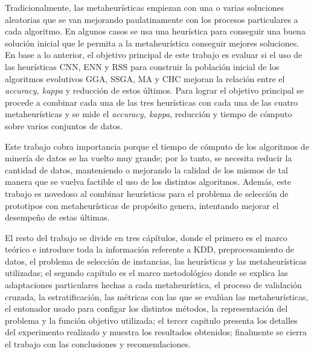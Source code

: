 Tradicionalmente, las metaheurísticas empiezan con una o varias soluciones aleatorias que se van mejorando paulatinamente con los procesos particulares a cada algoritmo. En algunos casos se usa una heurística para conseguir una buena solución inicial que le permita a la metaheurística conseguir mejores soluciones. En base a lo anterior, el objetivo principal de este trabajo es evaluar si el uso de las heurísticas CNN, ENN y RSS para construir la población inicial de los algoritmos evolutivos GGA, SSGA, MA y CHC  mejoran la relación entre el \emph{accuracy, kappa} y reducción de estos últimos. Para lograr el objetivo principal se procede a combinar cada una de las tres heurísticas con cada una de las cuatro metaheurísticas y se mide el \emph{accuracy, kappa}, reducción y tiempo de cómputo sobre varios conjuntos de datos. 

Este trabajo cobra importancia porque el tiempo de cómputo de los algoritmos de minería de datos se ha vuelto muy grande; por lo tanto, se necesita reducir la cantidad de datos, manteniendo o mejorando la calidad de los mismos de tal manera que se vuelva factible el uso de los distintos algoritmos. Además, este trabajo es novedoso al combinar heurísticas para el problema de selección de prototipos con metaheurísticas de propósito genera, intentando mejorar el desempeño de estas últimas.

El resto del trabajo se divide en tres cápítulos, donde el primero es el marco teórico e introduce toda la información referente a KDD, preprocesamiento de datos, el problema de selección de instancias, las heurísticas y las metaheurísticas utilizadas; el segundo capítulo es el marco metodológico donde se explica las adaptaciones particulares hechas a cada metaheurística, el proceso de validación cruzada, la estratificación, las métricas con las que se evalúan las metaheurísticas, el entonador usado para configar los distintos métodos, la representación del problema y la función objetivo utilizada; el tercer capítulo presenta los detalles del experimento realizado y muestra los resultados obtenidos; finalmente se cierra el trabajo con las conclusiones y recomendaciones.
